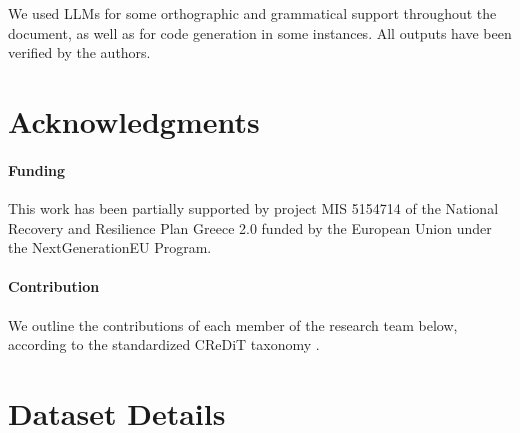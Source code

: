 \documentclass[11pt]{article}
\theoremstyle{definition}
\theoremstyle{plain}
\begin{document}
We used LLMs for some orthographic and grammatical support throughout the document, as well as for code generation in some instances. All outputs have been verified by the authors.


\section*{Acknowledgments}

\paragraph{Funding} This work has been partially supported by project MIS 5154714 of the National Recovery and Resilience Plan Greece 2.0 funded by the European Union under the NextGenerationEU Program.

\paragraph{Contribution} We outline the contributions of each member of the research team below, according to the standardized CReDiT taxonomy \citep{credit}.
\insertcredits


\appendix

\printacronyms[heading=section]


\section{Dataset Details}
\label{app:dataset}
\end{document}
